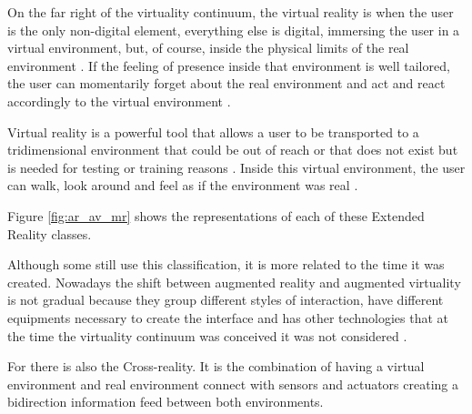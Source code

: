 On the far right of the virtuality continuum, the virtual reality is when the user is the only non-digital element, everything else is digital, immersing the user in a virtual environment, but, of course, inside the physical limits of the real environment \cite{ma2007virtuality}. If the feeling of presence inside that environment is well tailored, the user can momentarily forget about the real environment and act and react accordingly to the virtual environment \cite{farrell2018learning}. 
    
Virtual reality is a powerful tool that allows a user to be transported to a tridimensional environment that could be out of reach or that does not exist but is needed for testing or training reasons \cite{mujber2004virtual}. Inside this virtual environment, the user can walk, look around and feel as if the environment was real \cite{salah2019virtual}.

Figure \ref{fig:ar_av_mr} shows the representations of each of these Extended Reality classes.



Although some still use this classification, it is more related to the time it was created. Nowadays the shift between augmented reality and augmented virtuality is not gradual because they group different styles of interaction, have different equipments necessary to create the interface and has other technologies that at the time the virtuality continuum was conceived it was not considered \cite{cerqueira2019tangible}.

For  there is also the Cross-reality. It is the combination of having a virtual environment and real environment connect with sensors and actuators creating a bidirection information feed between both environments.
